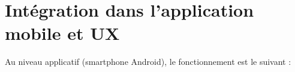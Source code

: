 
\section{Intégration dans l'application mobile et UX}

Au niveau applicatif (smartphone Android), le fonctionnement est le suivant :

